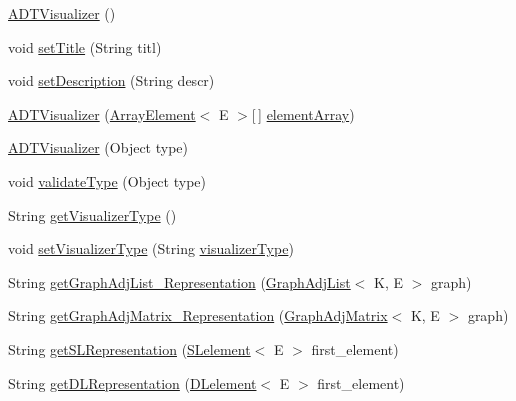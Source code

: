\begin{DoxyCompactItemize}
\item 
\hyperlink{classbridges_1_1base_1_1_a_d_t_visualizer_a3d5098e4c0609c19a547f19f0d538eeb}{A\+D\+T\+Visualizer} ()
\item 
void \hyperlink{classbridges_1_1base_1_1_a_d_t_visualizer_ab0fda74356fefe16f5b3b98a5fce1f9e}{set\+Title} (String titl)
\item 
void \hyperlink{classbridges_1_1base_1_1_a_d_t_visualizer_ab00d1c82e11326ce68c0146bc393c4b1}{set\+Description} (String descr)
\item 
\hyperlink{classbridges_1_1base_1_1_a_d_t_visualizer_acd2d6c0459173578f4fd95ac4d05cd10}{A\+D\+T\+Visualizer} (\hyperlink{classbridges_1_1base_1_1_array_element}{Array\+Element}$<$ E $>$\mbox{[}$\,$\mbox{]} \hyperlink{classbridges_1_1base_1_1_a_d_t_visualizer_a320739b4be463d3987b3de2463b0d592}{element\+Array})
\item 
\hyperlink{classbridges_1_1base_1_1_a_d_t_visualizer_af722d7ea9506b1ca8119ae39c43130ff}{A\+D\+T\+Visualizer} (Object type)
\item 
void \hyperlink{classbridges_1_1base_1_1_a_d_t_visualizer_a991fc08ab102bc0f861e0aefe75282e7}{validate\+Type} (Object type)
\item 
String \hyperlink{classbridges_1_1base_1_1_a_d_t_visualizer_aea37161ff4b74fbeae6f478b4c2e1a50}{get\+Visualizer\+Type} ()
\item 
void \hyperlink{classbridges_1_1base_1_1_a_d_t_visualizer_a5f423ff4295f3ae4371c86d4ab45638c}{set\+Visualizer\+Type} (String \hyperlink{classbridges_1_1base_1_1_a_d_t_visualizer_a288aece657b5641f48e839b34f3884b9}{visualizer\+Type})
\item 
String \hyperlink{classbridges_1_1base_1_1_a_d_t_visualizer_a0b923e3a1afd3d56b5c42ef39e4c5542}{get\+Graph\+Adj\+List\+\_\+\+Representation} (\hyperlink{classbridges_1_1base_1_1_graph_adj_list}{Graph\+Adj\+List}$<$ K, E $>$ graph)
\item 
String \hyperlink{classbridges_1_1base_1_1_a_d_t_visualizer_a7e3ecfc9522596bd12f0adef694eacf2}{get\+Graph\+Adj\+Matrix\+\_\+\+Representation} (\hyperlink{classbridges_1_1base_1_1_graph_adj_matrix}{Graph\+Adj\+Matrix}$<$ K, E $>$ graph)
\item 
String \hyperlink{classbridges_1_1base_1_1_a_d_t_visualizer_a8bfd44ca6eef7b19feb6061cb7e141ef}{get\+S\+L\+Representation} (\hyperlink{classbridges_1_1base_1_1_s_lelement}{S\+Lelement}$<$ E $>$ first\+\_\+element)
\item 
String \hyperlink{classbridges_1_1base_1_1_a_d_t_visualizer_a43eeb9f3321477f58edc3aff52631f3b}{get\+D\+L\+Representation} (\hyperlink{classbridges_1_1base_1_1_d_lelement}{D\+Lelement}$<$ E $>$ first\+\_\+element)

\end{DoxyCompactItemize}
